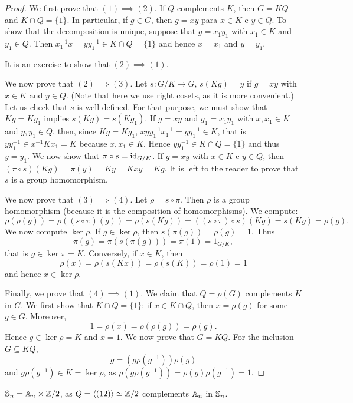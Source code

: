 \begin{proof}
We first prove that $(1)\implies(2)$. If $Q$ complements $K$, then $G=KQ$ and
$K\cap Q=\{1\}$. In particular, if $g\in G$, then $g=xy$ para $x\in K$ e $y\in Q$. To show that
the decomposition is unique, suppose that 
$g=x_1y_1$ with $x_1\in K$ and $y_1\in Q$. Then $x_1^{-1}x=yy_1^{-1}\in K\cap Q=\{1\}$ 
and hence $x=x_1$ and $y=y_1$.

It is an exercise to show that $(2)\implies(1)$.

We now prove that $(2)\implies(3)$. Let $s\colon G/K\to G$, $s(Kg)=y$ if 
$g=xy$ with $x\in K$ and $y\in Q$. (Note that here we use right cosets, as it is more convenient.)
Let us check that $s$ is well-defined. 
For that purpose, we must show that $Kg=Kg_1$ implies $s(Kg)=s(Kg_1)$. If $g=xy$ 
and $g_1=x_1y_1$ with $x,x_1\in K$ and $y,y_1\in Q$, then, since $Kg=Kg_1$, 
$xyy_1^{-1}x_1^{-1}=gg_1^{-1}\in K$, that is $yy_1^{-1}\in x^{-1}Kx_1=K$
 because $x,x_1\in K$. Hence $yy_1^{-1}\in K\cap Q=\{1\}$ and thus $y=y_1$. 
 We now show that $\pi\circ
 s=\operatorname{id}_{G/K}$. If $g=xy$ with $x\in K$ e $y\in Q$, then
$(\pi\circ s)(Kg)=\pi(y)=Ky=Kxy=Kg$. It is left to the reader to prove that 
$s$ is a group homomorphism. 

We now prove that $(3)\implies(4)$. Let $\rho=s\circ\pi$. Then $\rho$ is a group homomorphism (because it is the composition of homomorphisms). We compute: 
\[
\rho(\rho(g))=\rho( (s\circ\pi)(g))=\rho(s(Kg))=((s\circ\pi)\circ s)(Kg)=s(Kg)=\rho(g).
\]
We now compute $\ker\rho$. If $g\in\ker\rho$, then $s(\pi(g))=\rho(g)=1$. Thus 
\[
\pi(g)=\pi(s(\pi(g)))=\pi(1)=1_{G/K},
\]
that is $g\in\ker\pi=K$. Conversely, if $x\in K$, then
\[
\rho(x)=\rho(s(Kx))=\rho(s(K))=\rho(1)=1
\]
and hence $x\in\ker\rho$.

Finally, we prove that $(4)\implies(1)$. We claim that $Q=\rho(G)$ complements $K$ in
 $G$. We first show that $K\cap Q=\{1\}$: if $x\in K\cap Q$, then $x=\rho(g)$ for some $g\in G$. Moreover, 
\[
1=\rho(x)=\rho(\rho(g))=\rho(g).
\]
Hence $g\in\ker\rho=K$ and $x=1$. We now prove that $G=KQ$. For the inclusion $G\subseteq KQ$, 
\[
g=(g\rho(g^{-1}))\rho(g)
\]
and $g\rho(g^{-1})\in K=\ker\rho$, as $\rho(g\rho(g^{-1}))=  \rho(g)\rho(g^{-1})=1$.
\end{proof}

\begin{example}
$\mathbb{S}_n=\mathbb{A}_n\rtimes\mathbb{Z}/2$, as $Q=\langle (12)\rangle\simeq\mathbb{Z}/2$ complements 
$\mathbb{A}_n$ in $\mathbb{S}_n$.
\end{example}

